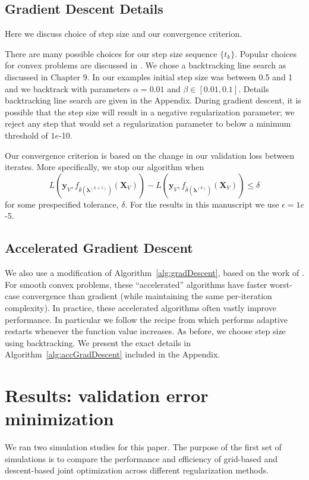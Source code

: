 \documentclass[10pt,letterpaper]{article}
\begin{document}
\subsection{Gradient Descent Details}
Here we discuss choice of step size and our convergence criterion.

There are many possible choices for our step size sequence $\{t_k\}$. Popular choices for convex problems are discussed in \citet{boyd2004convex}. We chose a backtracking line search as discussed in Chapter 9. In our examples initial step size was between 0.5 and 1 and we backtrack with parameters $\alpha = 0.01$ and $\beta \in [0.01, 0.1]$. Details backtracking line search are given in the Appendix. During gradient descent, it is possible that the step size will result in a negative regularization parameter; we reject any step that would set a regularization parameter to below a minimum threshold of $1e$-10.

Our convergence criterion is based on the change in our validation loss between iterates. More specifically, we stop our algorithm when
\[
L \left( \boldsymbol{y}_V, f_{\hat{\theta}(\boldsymbol{\lambda}^{(k+1)})}(\boldsymbol{X}_V)\right) - L \left( \boldsymbol{y}_V, f_{\hat{\theta}(\boldsymbol{\lambda}^{(k)})}(\boldsymbol{X}_V)\right) \leq \delta
\]
for some prespecified tolerance, $\delta$. For the results in this manuscript we use $\epsilon = 1e$-5.

\subsection{Accelerated Gradient Descent}
We also use a modification of Algorithm~\ref{alg:gradDescent}, based on the work of \citet{nesterov1983method}. For smooth convex problems, these ``accelerated'' algorithms have faster worst-case convergence than gradient (while maintaining the same per-iteration complexity). In practice, these accelerated algorithms often vastly improve performance. In particular we follow the recipe from \citet{o2013adaptive} which performs adaptive restarts whenever the function value increases. As before, we choose step size using backtracking. We present the exact details in Algorithm~\ref{alg:accGradDescent} included in the Appendix.

\section{Results: validation error minimization}

We ran two simulation studies for this paper. The purpose of the first set of simulations is to compare the performance and efficiency of grid-based and descent-based joint optimization across different regularization methods.
\end{document}
